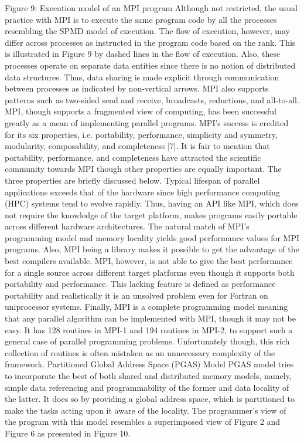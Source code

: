 Figure 9: Execution model of an MPI program
Although not restricted, the usual practice with MPI is to execute the same program code by all the processes resembling the SPMD model of execution. The flow of execution, however, may differ across processes as instructed in the program code based on the rank. This is illustrated in Figure 9 by dashed lines in the flow of execution. Also, these processes operate on separate data entities since there is no notion of distributed data structures. Thus, data sharing is made explicit through communication between processes as indicated by non-vertical arrows. MPI also supports patterns such as two-sided send and receive, broadcasts, reductions, and all-to-all. 
MPI, though supports a fragmented view of computing, has been successful greatly as a mean of implementing parallel programs. MPI’s success is credited for its six properties, i.e. portability, performance, simplicity and symmetry, modularity, composability, and completeness [7]. It is fair to mention that portability, performance, and completeness have attracted the scientific community towards MPI though other properties are equally important. The three properties are briefly discussed below.
Typical lifespan of parallel applications exceeds that of the hardware since high performance computing (HPC) systems tend to evolve rapidly. Thus, having an API like MPI, which does not require the knowledge of the target platform, makes programs easily portable across different hardware architectures. 
The natural match of MPI’s programming model and memory locality yields good performance values for MPI programs. Also, MPI being a library makes it possible to get the advantage of the best compilers available. MPI, however, is not able to give the best performance for a single source across different target platforms even though it supports both portability and performance. This lacking feature is defined as performance portability and realistically it is an unsolved problem even for Fortran on uniprocessor systems.
Finally, MPI is a complete programming model meaning that any parallel algorithm can be implemented with MPI, though it may not be easy. It has 128 routines in MPI-1 and 194 routines in MPI-2, to support such a general case of parallel programming problems. Unfortunately though, this rich collection of routines is often mistaken as an unnecessary complexity of the framework.
Partitioned Global Address Space (PGAS) Model
PGAS model tries to incorporate the best of both shared and distributed memory models, namely, simple data referencing and programmability of the former and data locality of the latter. It does so by providing a global address space, which is partitioned to make the tasks acting upon it aware of the locality. The programmer’s view of the program with this model resembles a superimposed view of Figure 2 and Figure 6 as presented in Figure 10. 

